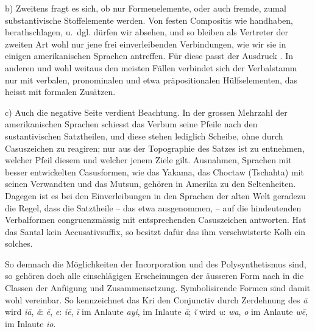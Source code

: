 b) Zweitens fragt es sich, ob nur Formenelemente, oder auch fremde, zumal substantivische Stoffelemente  werden. Von festen Compositis wie handhaben, berathschlagen,  u.~dgl. dürfen wir absehen, und so bleiben als Vertreter der zweiten Art wohl nur jene frei einverleibenden Verbindungen, wie wir sie in einigen amerikanischen Sprachen antreffen. Für diese passt der Ausdruck . In anderen und wohl weitaus den meisten Fällen verbindet sich der Verbalstamm nur mit verbalen, pronominalen und etwa präpositionalen Hülfselementen, das heisst mit formalen Zusätzen.

c) Auch die negative Seite verdient Beachtung. In der grossen Mehrzahl der amerikanischen Sprachen schiesst das Verbum seine Pfeile nach den sustantivischen Satztheilen, und diese stehen lediglich Scheibe, ohne durch Casuszeichen zu reagiren; nur aus der Topographie des Satzes ist zu entnehmen, welcher Pfeil diesem und welcher jenem Ziele gilt. Ausnahmen, Sprachen mit besser entwickelten Casusformen, wie das Yakama, das Choctaw (Tschahta) mit seinen Verwandten und das Mutsun, gehören in Amerika zu den Seltenheiten. Dagegen ist es bei den Ein\label{fp.341}verleibungen in den Sprachen der alten Welt geradezu die Regel, dass die  Satztheile – das  etwa ausgenommen, – auf die hindeutenden Verbalformen congruenzmässig mit entsprechenden Casuszeichen antworten. Hat das Santal kein Accusativsuffix, so besitzt dafür das ihm verschwisterte Kolh ein solches.

\label{sp.359}

So  demnach die Möglichkeiten der Incorporation und des Polysynthetismus sind, so gehören doch alle einschlägigen Erscheinungen der äusseren Form nach in die Classen der Anfügung und Zusammensetzung. Symbolisirende Formen sind damit wohl vereinbar. So kennzeichnet das Kri den Conjunctiv durch Zerdehnung des  \textit{ā} wird \textit{iā}, \textit{ă}: \textit{ē}, \textit{e}: \textit{iē}, \textit{ī} im Anlaute \textit{ayi}, im Inlaute \textit{ā}; \textit{ĭ} wird  \textit{u}: \textit{wa}, \textit{o} im Anlaute \textit{wē}, im Inlaute \textit{io}.

